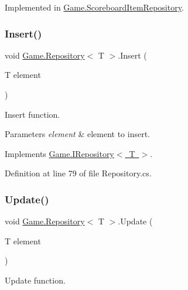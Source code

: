 Implemented in \mbox{\hyperlink{class_game_1_1_scoreboard_item_repository_acd35ca45dedeb7e13634a08185f704e8}{Game.\+Scoreboard\+Item\+Repository}}.

\mbox{\label{class_game_1_1_repository_ae6382abbe87ee7fb27ff74103459b3ed}} 
\subsubsection{\texorpdfstring{Insert()}{Insert()}}
{\footnotesize\ttfamily void \mbox{\hyperlink{class_game_1_1_repository}{Game.\+Repository}}$<$ T $>$.Insert (\begin{DoxyParamCaption}\item[{T}]{element }\end{DoxyParamCaption})}



Insert function. 


\begin{DoxyParams}{Parameters}
{\em element} & element to insert.\\
\hline
\end{DoxyParams}


Implements \mbox{\hyperlink{interface_game_1_1_i_repository_a07afb17fde8c49eb4bfd61e031c4b76c}{Game.\+I\+Repository$<$ T $>$}}.



Definition at line 79 of file Repository.\+cs.

\mbox{\label{class_game_1_1_repository_a798084f6c10a2603f2be991ef872b072}} 
\subsubsection{\texorpdfstring{Update()}{Update()}}
{\footnotesize\ttfamily void \mbox{\hyperlink{class_game_1_1_repository}{Game.\+Repository}}$<$ T $>$.Update (\begin{DoxyParamCaption}\item[{T}]{element }\end{DoxyParamCaption})}



Update function. 



